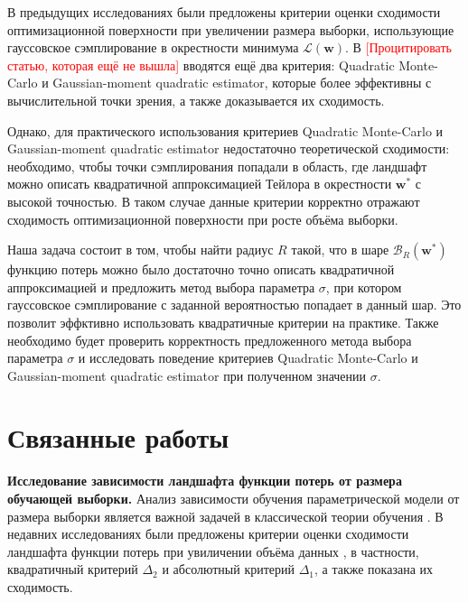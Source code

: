 \documentclass[11pt,a4paper]{article}
\begin{document}
В предыдущих исследованиях \cite{kiselev2025robust, kiselev2025likelihood} были предложены критерии оценки сходимости оптимизационной поверхности при увеличении размера выборки, использующие гауссовское сэмплирование в окрестности минимума $\mathcal{L}(\mathbf{w})$. В \textcolor{red}{[Процитировать статью, которая ещё не вышла]} вводятся ещё два критерия: Quadratic Monte-Carlo и Gaussian-moment quadratic estimator, которые более эффективны с вычислительной точки зрения, а также доказывается их сходимость. 



Однако, для практического использования критериев Quadratic Monte-Carlo и Gaussian-moment quadratic estimator недостаточно  теоретической сходимости: необходимо, чтобы точки сэмплирования попадали в область, где ландшафт  можно описать квадратичной аппроксимацией Тейлора в окрестности $\mathbf{w}^{*}$ с высокой точностью. В таком случае данные критерии  корректно отражают сходимость оптимизационной поверхности при росте объёма выборки.

Наша задача состоит в том, чтобы найти радиус $R$ такой, что в шаре $\mathcal{B}_R(\mathbf{w}^*)$ функцию потерь можно было достаточно точно описать квадратичной аппроксимацией и предложить метод выбора параметра $\sigma$, при котором гауссовское сэмплирование с заданной вероятностью попадает в данный шар. Это позволит эффктивно использовать квадратичные критерии на практике. Также необходимо будет проверить корректность предложенного метода выбора параметра $\sigma$ и исследовать поведение критериев Quadratic Monte-Carlo и Gaussian-moment quadratic estimator при полученном значении $\sigma$.


\section{Связанные работы}

\textbf{Исследование зависимости ландшафта функции потерь от размера обучающей выборки.} Анализ зависимости обучения параметрической модели от размера выборки является важной задачей в классической теории обучения \cite{vapnik1995nature}. В недавних исследованиях были предложены критерии оценки сходимости ландшафта функции потерь при увиличении объёма данных \cite{kiselev2025likelihood, kiselev2025posterior}, в частности, квадратичный критерий $\Delta_2$ и абсолютный критерий $\Delta_1$, а также показана их сходимость.
\end{document}
